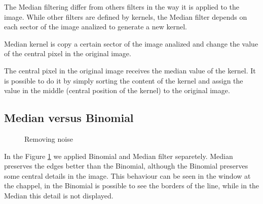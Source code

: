 \documentclass{article}
\begin{document}
		The Median filtering differ from others filters in the way it is applied to the image. While other filters are defined by kernels, the Median filter depends on each sector of the image analized to generate a new kernel.

		Median kernel is copy a certain sector of the image analized and change the value of the central pixel in the original image. 

		The central pixel in the original image receives the median value of the kernel. It is possible to do it by simply sorting the content of the kernel and assign the value in the middle (central position of the kernel) to the original image. 

	\subsection{Median versus Binomial}

		\begin{figure}[H]
		  \centering
		  \caption{Removing noise}
		  \label{fig:removingnoise}
		\end{figure}		

	In the Figure \ref{fig:removingnoise} we applied Binomial and Median filter separetely. 
	Median preserves the edges better than the Binomial, although the Binomial preserves some central details in the image. 
	This behaviour can be seen in the window at the chappel, in the Binomial is possible to see the borders of the line, while in the Median this detail is not displayed. 
\end{document}
